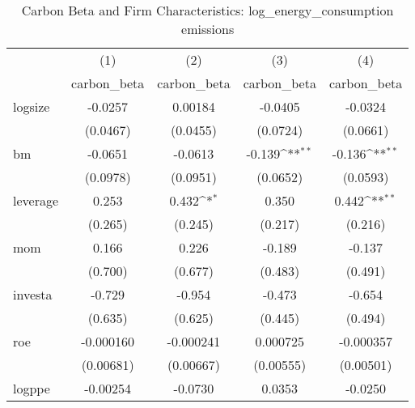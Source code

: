 \begin{table}[htbp]\centering
\def\sym#1{\ifmmode^{#1}\else\(^{#1}\)\fi}
\caption{Carbon Beta and Firm Characteristics: log\_energy\_consumption emissions}
\begin{tabular}{l*{4}{c}}
\hline\hline
                    &\multicolumn{1}{c}{(1)}&\multicolumn{1}{c}{(2)}&\multicolumn{1}{c}{(3)}&\multicolumn{1}{c}{(4)}\\
                    &\multicolumn{1}{c}{carbon\_beta}&\multicolumn{1}{c}{carbon\_beta}&\multicolumn{1}{c}{carbon\_beta}&\multicolumn{1}{c}{carbon\_beta}\\
\hline
logsize             &     -0.0257         &     0.00184         &     -0.0405         &     -0.0324         \\
                    &    (0.0467)         &    (0.0455)         &    (0.0724)         &    (0.0661)         \\
[1em]
bm                  &     -0.0651         &     -0.0613         &      -0.139\sym{**} &      -0.136\sym{**} \\
                    &    (0.0978)         &    (0.0951)         &    (0.0652)         &    (0.0593)         \\
[1em]
leverage            &       0.253         &       0.432\sym{*}  &       0.350         &       0.442\sym{**} \\
                    &     (0.265)         &     (0.245)         &     (0.217)         &     (0.216)         \\
[1em]
mom                 &       0.166         &       0.226         &      -0.189         &      -0.137         \\
                    &     (0.700)         &     (0.677)         &     (0.483)         &     (0.491)         \\
[1em]
investa             &      -0.729         &      -0.954         &      -0.473         &      -0.654         \\
                    &     (0.635)         &     (0.625)         &     (0.445)         &     (0.494)         \\
[1em]
roe                 &   -0.000160         &   -0.000241         &    0.000725         &   -0.000357         \\
                    &   (0.00681)         &   (0.00667)         &   (0.00555)         &   (0.00501)         \\
[1em]
logppe              &    -0.00254         &     -0.0730         &      0.0353         &     -0.0250         \\

\end{tabular}
\end{table}
